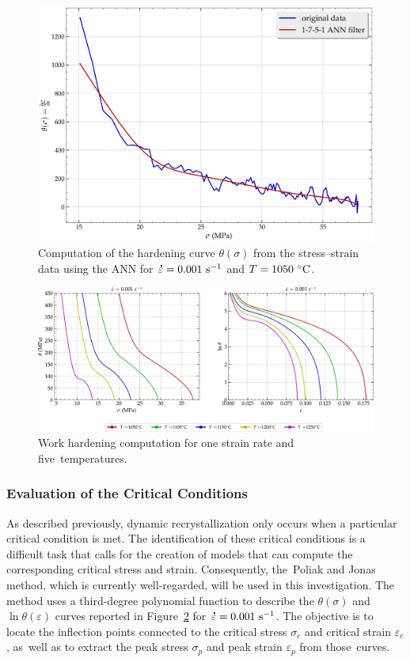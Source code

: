 \documentclass[metals,article,accept,pdftex,moreauthors]{Definitions/mdpi}
\DeclareRobustCommand{\mdot}[1]{\accentset{\mbox{\bfseries .}}{#1}}
\DeclareRobustCommand{\ps}{\text{s}^{-1}}
\begin{document}
\begin{figure}[H]
\centering
\includegraphics[width=0.7\columnwidth]{Figures/AnnTheta}
\caption{Computation of the hardening curve $\theta(\sigma)$ from the stress--strain data using the ANN for $\mdot\varepsilon=0.001~\ps$ and $T=1050~\celsius$.}
\label{fig:AnnTheta}
\end{figure}
\unskip

\begin{figure}[H]
\centering
\includegraphics[width=0.99\columnwidth]{Figures/nThetaOP}
\caption{Work hardening computation for one strain rate and five~temperatures.}
\label{fig:nThetaOP}
\end{figure}
\unskip

\subsubsection{Evaluation of the Critical Conditions}\label{subsec:CrConditions}

As described previously, dynamic recrystallization only occurs when a particular critical condition is met.
The identification of these critical conditions is a difficult task that calls for the creation of models that can compute the corresponding critical stress and strain.
Consequently, the~Poliak and Jonas~\cite{Poliak-1996,Poliak-2003,Poliak-2003-2,Jonas-2003} method, which is currently well-regarded, will be used in this investigation.
The method uses a third-degree polynomial function to describe the $\theta(\sigma)$ and $\ln \theta(\varepsilon)$ curves reported in Figure~\ref{fig:nThetaOP} for $\mdot\varepsilon=0.001~\ps$.
The objective is to locate the inflection points connected to the critical stress $\sigma_c$ and critical strain $\varepsilon_c$, as~well as to extract the peak stress $\sigma_p$ and peak strain $\varepsilon_p$ from those~curves.
\end{document}
